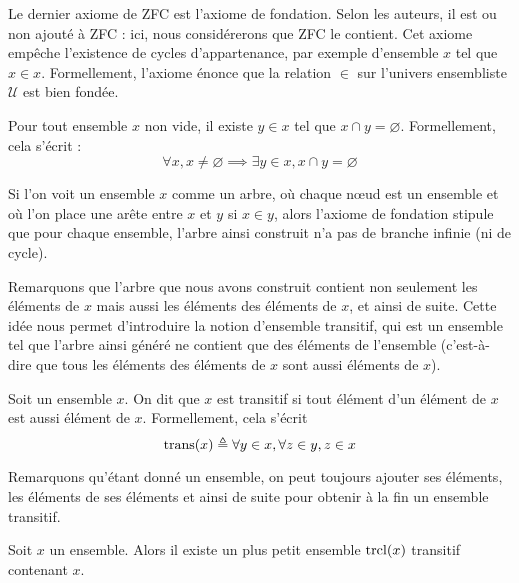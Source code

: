 Le dernier axiome de ZFC est l'axiome de fondation. Selon les auteurs, il est ou
non ajouté à ZFC : ici, nous considérerons que ZFC le contient. Cet axiome
empêche l'existence de cycles d'appartenance, par exemple d'ensemble $x$ tel que
$x\in x$. Formellement, l'axiome énonce que la relation $\in$ sur l'univers
ensembliste $\mathcal U$ est bien fondée.

\begin{axiom}[Fondation]\label{ax.ZF.AF}
  Pour tout ensemble $x$ non vide, il existe $y\in x$ tel que
  $x\cap y = \varnothing$. Formellement, cela s'écrit :
  \[\forall x, x\neq\varnothing \implies \exists y \in x, x\cap y =
  \varnothing\]
\end{axiom}

Si l'on voit un ensemble $x$ comme un arbre, où chaque n\oe ud est un ensemble
et où l'on place une arête entre $x$ et $y$ si $x\in y$, alors l'axiome de
fondation stipule que pour chaque ensemble, l'arbre ainsi construit n'a pas de
branche infinie (ni de cycle).

Remarquons que l'arbre que nous avons construit contient non seulement les
éléments de $x$ mais aussi les éléments des éléments de $x$, et ainsi de suite.
Cette idée nous permet d'introduire la notion d'ensemble transitif, qui est un
ensemble tel que l'arbre ainsi généré ne contient que des éléments de l'ensemble
(c'est-à-dire que tous les éléments des éléments de $x$ sont aussi éléments de
$x$).

\begin{definition}
  Soit un ensemble $x$. On dit que $x$ est transitif si tout élément d'un
  élément de $x$ est aussi élément de $x$. Formellement, cela s'écrit
  \[\operatorname{trans}(x) \triangleq \forall y\in x, \forall z \in y, z\in x\]
\end{definition}

Remarquons qu'étant donné un ensemble, on peut toujours ajouter ses éléments,
les éléments de ses éléments et ainsi de suite pour obtenir à la fin un ensemble
transitif.

\begin{proposition}
  Soit $x$ un ensemble. Alors il existe un plus petit ensemble $\operatorname{trcl}(x)$
  transitif contenant $x$.
\end{proposition}

